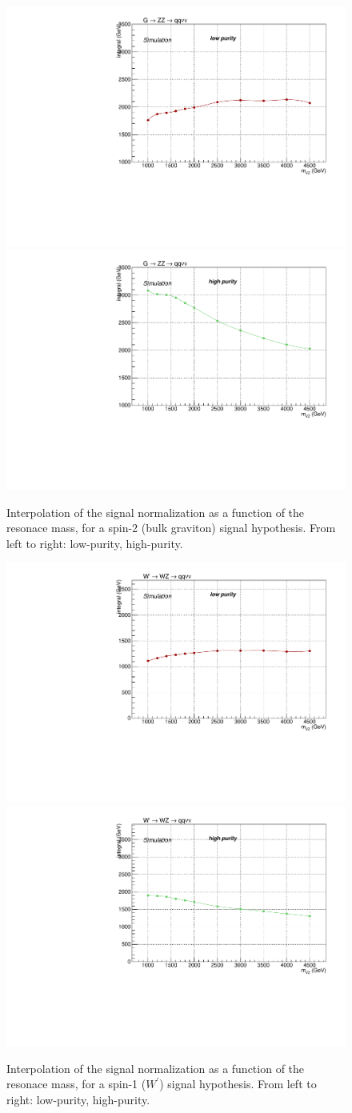 \begin{figure}[!htb]
  \centering
    \includegraphics[width=.495\textwidth]{plotsAlpha_tesi/XVZnnlp/XZZInv_SignalNorm.pdf}
    \includegraphics[width=.495\textwidth]{plotsAlpha_tesi/XVZnnhp/XZZInv_SignalNorm.pdf}
  \caption{Interpolation of the signal normalization as a function of the resonace mass, for a spin-2 (bulk graviton) signal hypothesis. From left to right: low-purity, high-purity.}
  \label{fig:XZZ_SignalNorm}
\end{figure}

\begin{figure}[!htb]
  \centering
    \includegraphics[width=.495\textwidth]{plotsAlpha_tesi/XVZnnlp/XWZInv_SignalNorm.pdf}
    \includegraphics[width=.495\textwidth]{plotsAlpha_tesi/XVZnnhp/XWZInv_SignalNorm.pdf}
  \caption{Interpolation of the signal normalization as a function of the resonace mass, for a spin-1 ($W^{'}$) signal hypothesis. From left to right: low-purity, high-purity.}
  \label{fig:XWZ_SignalNorm}
\end{figure}


\clearpage

